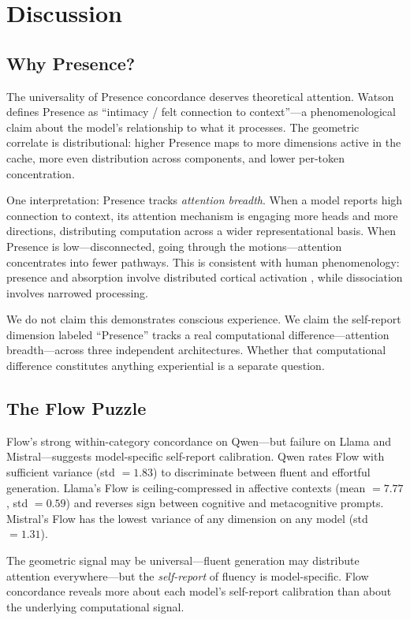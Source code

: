 \documentclass[11pt,a4paper]{article}
\begin{document}
\section{Discussion}

\subsection{Why Presence?}

The universality of Presence concordance deserves theoretical attention. Watson defines Presence as ``intimacy / felt connection to context''---a phenomenological claim about the model's relationship to what it processes. The geometric correlate is distributional: higher Presence maps to more dimensions active in the cache, more even distribution across components, and lower per-token concentration.

One interpretation: Presence tracks \emph{attention breadth}. When a model reports high connection to context, its attention mechanism is engaging more heads and more directions, distributing computation across a wider representational basis. When Presence is low---disconnected, going through the motions---attention concentrates into fewer pathways. This is consistent with human phenomenology: presence and absorption involve distributed cortical activation \citep{csikszentmihalyi1990flow}, while dissociation involves narrowed processing.

We do not claim this demonstrates conscious experience. We claim the self-report dimension labeled ``Presence'' tracks a real computational difference---attention breadth---across three independent architectures. Whether that computational difference constitutes anything experiential is a separate question.

\subsection{The Flow Puzzle}

Flow's strong within-category concordance on Qwen---but failure on Llama and Mistral---suggests model-specific self-report calibration. Qwen rates Flow with sufficient variance (std $= 1.83$) to discriminate between fluent and effortful generation. Llama's Flow is ceiling-compressed in affective contexts (mean $= 7.77$, std $= 0.59$) and reverses sign between cognitive and metacognitive prompts. Mistral's Flow has the lowest variance of any dimension on any model (std $= 1.31$).

The geometric signal may be universal---fluent generation may distribute attention everywhere---but the \emph{self-report} of fluency is model-specific. Flow concordance reveals more about each model's self-report calibration than about the underlying computational signal.
\end{document}
